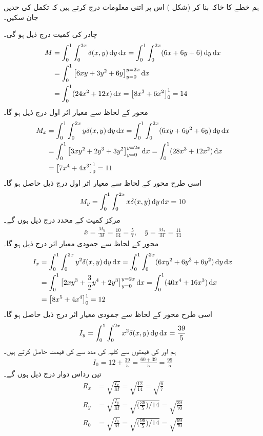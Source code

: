 ہم  خطے کا خاکہ بنا کر (شکل )   اس پر اتنی معلومات درج کرتے ہیں کہ تکمل کی حدیں  جان سکیں۔

چادر کی کمیت درج ذیل ہو گی۔
\begin{align*}
M&=\int_0^1\int_0^{2x}\delta(x,y)\dif y\dif x=\int_0^1\int_0^{2x}(6x+6y+6)\dif y\dif x\\
&=\int_0^1\big[6xy+3y^2+6y\big]_{y=0}^{y=2x}\dif x\\
&=\int_0^1(24x^2+12x)\dif x=\big[8x^3+6x^2\big]_0^1=14
\end{align*}
محور  کے لحاظ سے معیار اثر  اول درج ذیل ہو گا۔
\begin{align*}
M_x&=\int_0^1\int_0^{2x}y\delta(x,y)\dif y\dif x=\int_0^1\int_0^{2x}(6xy+6y^2+6y)\dif y\dif x\\
&=\int_0^1\big[3xy^2+2y^3+3y^2\big]_{y=0}^{y=2x}\dif x=\int_0^1 (28x^3+12x^2)\dif x\\
&=\big[7x^4+4x^3\big]_0^1=11
\end{align*}
اسی طرح محور  کے  لحاظ سے معیار اثر  اول درج ذیل حاصل ہو گا۔
\begin{align*}
M_y=\int_0^1\int_0^{2x}x\delta(x,y)\dif y\dif x=10
\end{align*}
مرکز کمیت کے محدد درج ذیل ہوں گے۔
\begin{align*}
\bar{x}=\frac{M_y}{M}=\frac{10}{14}=\frac{5}{7},\quad \bar{y}=\frac{M_x}{M}=\frac{11}{14}
\end{align*} 
محور  کے لحاظ  سے جمودی معیار اثر درج ذیل ہو گا۔
\begin{align*}
I_x&=\int_0^1\int_0^{2x}y^2\delta(x,y)\dif y\dif x=\int_0^1\int_0^{2x}(6xy^2+6y^3+6y^2)\dif y\dif x\\
&=\int_0^1\big[2xy^3+\frac{3}{2}y^4+2y^3\big]_{y=0}^{y=2x}\dif x=\int_0^1(40x^4+16x^3)\dif x\\
&=\big[8x^5+4x^4\big]_0^1=12
\end{align*}
اسی طرح  محور  کے لحاظ سے جمودی معیار اثر درج ذیل حاصل ہو گا۔
\begin{align*}
I_y=\int_0^1\int_0^{2x}x^2\delta(x,y)\dif y\dif x=\frac{39}{5}
\end{align*}
ہم  اور  کی قیمتوں سے  کلیہ  کی مدد  سے     کی قیمت حاصل کرتے ہیں۔
\begin{align*}
I_0=12+\frac{39}{5}=\frac{60+39}{5}=\frac{99}{5}
\end{align*}
تین رداس دوار درج ذیل ہوں گے۔
\begin{align*}
R_x&=\sqrt{\frac{I_x}{M}}=\sqrt{\frac{12}{14}}=\sqrt{\frac{6}{7}}\\
R_y&=\sqrt{\frac{I_y}{M}}=\sqrt{\big(\frac{39}{5}\big)/14}=\sqrt{\frac{39}{70}}\\
R_0&=\sqrt{\frac{I_0}{M}}=\sqrt{\big(\frac{99}{5}\big)/14}=\sqrt{\frac{99}{70}}
\end{align*}
